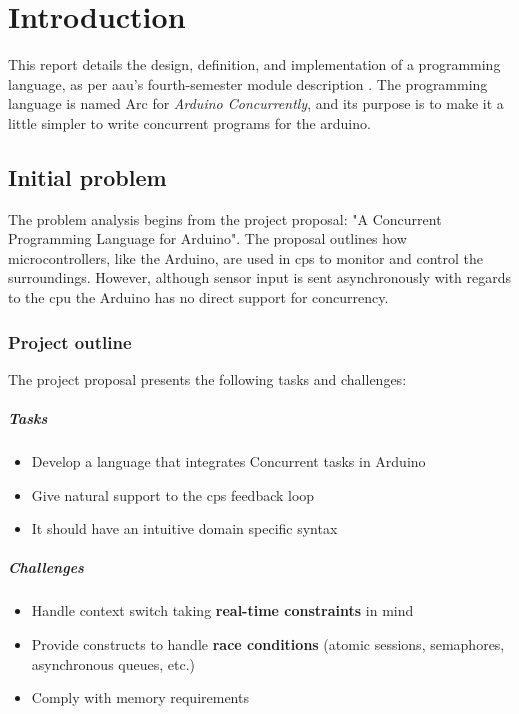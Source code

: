 \chapter{Introduction}\label{cha:introduction}
This report details the design, definition, and implementation of a programming language, as per \gls{aau}'s fourth-semester module description \cite{AAU_Modules_P4}. The programming language is named Arc for \textit{Arduino Concurrently}, and its purpose is to make it a little simpler to write concurrent programs for the arduino.

\section{Initial problem}\label{sec:initialproblem}
The problem analysis begins from the project proposal: "A Concurrent Programming Language for Arduino". The proposal outlines how microcontrollers, like the Arduino, are used in \gls{cps} to monitor and control the surroundings. However, although sensor input is sent asynchronously with regards to the \gls{cpu} the Arduino has no direct support for concurrency.

\subsection{Project outline}
The project proposal presents the following tasks and challenges:

\paragraph{Tasks}
\begin{itemize}
    \item Develop a language that integrates Concurrent tasks in Arduino
    \item Give natural support to the \gls{cps} feedback loop
    \item It should have an intuitive domain specific syntax
\end{itemize}

\paragraph{Challenges}
\begin{itemize}
    \item Handle context switch taking \textbf{real-time constraints} in mind
    \item Provide constructs to handle \textbf{race conditions} (atomic sessions, semaphores, asynchronous queues, etc.)
    \item Comply with memory requirements
\end{itemize}

